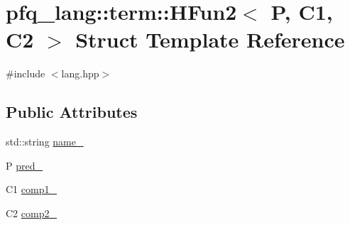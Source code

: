 \hypertarget{structpfq__lang_1_1term_1_1HFun2}{\section{pfq\-\_\-lang\-:\-:term\-:\-:H\-Fun2$<$ P, C1, C2 $>$ Struct Template Reference}
\label{structpfq__lang_1_1term_1_1HFun2}
}


{\ttfamily \#include $<$lang.\-hpp$>$}

\subsection*{Public Attributes}
\begin{DoxyCompactItemize}
\item 
std\-::string \hyperlink{structpfq__lang_1_1term_1_1HFun2_aa3808dccb93ad00cfd0be7caa80f30b9}{name\-\_\-}
\item 
P \hyperlink{structpfq__lang_1_1term_1_1HFun2_aa33f80727f25efed1112901cbcf1098a}{pred\-\_\-}
\item 
C1 \hyperlink{structpfq__lang_1_1term_1_1HFun2_a7c395ee57e98d0991b54984ed3da65a8}{comp1\-\_\-}
\item 
C2 \hyperlink{structpfq__lang_1_1term_1_1HFun2_a9d891e5539b5140e3ba2c4a02c9ac1fb}{comp2\-\_\-}
\end{DoxyCompactItemize}


